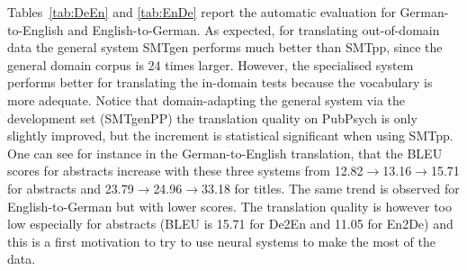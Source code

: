 \documentclass[a4paper,11pt]{article}
\begin{document}
Tables~\ref{tab:DeEn} and \ref{tab:EnDe} report the automatic evaluation for German-to-English and English-to-German. As expected, for translating out-of-domain data the general system SMTgen performs much better than SMTpp, since the general domain corpus is 24 times larger. However, the specialised system performs better for translating the in-domain tests because the vocabulary is more adequate. Notice that domain-adapting the general system via the development set (SMTgenPP) the translation quality on PubPsych is only slightly improved, but the increment is statistical significant when using SMTpp. One can see for instance in the  German-to-English translation, that the BLEU scores for abstracts increase with these three systems from  12.82$\rightarrow$13.16$\rightarrow$15.71 for abstracts and 
23.79$\rightarrow$24.96$\rightarrow$33.18 for titles. The same trend is observed for English-to-German but with lower scores. The translation quality is however too low especially for abstracts (BLEU is 15.71 for De2En and 11.05 for En2De) and this is a first motivation to try to use neural systems to make the most of the data.
 
\end{document}
